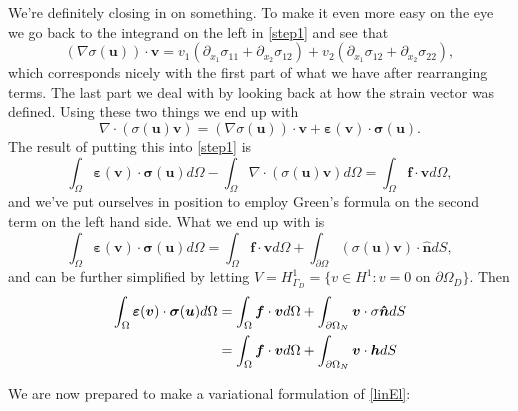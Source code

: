 \documentclass[paper=a4, fontsize=11pt]{scrartcl} %
\begin{document}
We're definitely closing in on something. To make it even more easy on the eye we go back to the integrand on the left in \ref{step1} and see that
\begin{equation*}
(\nabla \sigma(\boldsymbol{u}))\cdot \boldsymbol{v} = v_1(\partial_{x_1}\sigma_{11} + \partial_{x_2}\sigma_{12}) + v_2(\partial_{x_1}\sigma_{12} + \partial_{x_2}\sigma_{22}),
\end{equation*}
which corresponds nicely with the first part of what we have after rearranging terms. The last part we deal with by looking back at how the strain vector was defined. Using these two things we end up with
\begin{equation}
\label{step2}
\nabla \cdot (\sigma(\boldsymbol{u})\boldsymbol{v}) = (\nabla \sigma(\boldsymbol{u}))\cdot \boldsymbol{v} + \boldsymbol{\varepsilon}(\boldsymbol{v})\cdot \boldsymbol{\sigma}(\boldsymbol{u}).
\end{equation}
The result of putting this into \ref{step1} is
\begin{equation*}
\int_{\Omega}\boldsymbol{\varepsilon}(\boldsymbol{v})\cdot \boldsymbol{\sigma}(\boldsymbol{u})d\Omega - \int_{\Omega}\nabla \cdot (\sigma(\boldsymbol{u})\boldsymbol{v})d\Omega = \int_{\Omega}\boldsymbol{f}\cdot \boldsymbol{v} d\Omega,
\end{equation*}
and we've put ourselves in position to employ Green's formula on the second term on the left hand side. What we end up with is
\begin{equation*}
\int_{\Omega}\boldsymbol{\varepsilon}(\boldsymbol{v})\cdot \boldsymbol{\sigma}(\boldsymbol{u})d\Omega = \int_{\Omega}\boldsymbol{f}\cdot \boldsymbol{v} d\Omega + \int_{\partial \Omega}(\sigma(\boldsymbol{u})\boldsymbol{v})\cdot\boldsymbol{\hat{n}}dS,
\end{equation*}
and can be further simplified by letting $V = H^1_{\Gamma_D}=\{v \in H^1 : v=0$ on $\partial \Omega_D \}$. Then
\begin{align*}
\int_{\Omega}\boldsymbol{\varepsilon}(\boldsymbol{v})\cdot \boldsymbol{\sigma}(\boldsymbol{u})d\Omega &= \int_{\Omega}\boldsymbol{f}\cdot \boldsymbol{v} d\Omega + \int_{\partial \Omega_N}\boldsymbol{v}\cdot \sigma\boldsymbol{\hat{n}}dS  \notag \\
&= \int_{\Omega}\boldsymbol{f}\cdot \boldsymbol{v} d\Omega + \int_{\partial \Omega_N}\boldsymbol{v}\cdot\boldsymbol{h}dS
\end{align*}

We are now prepared to make a variational formulation of \ref{linEl}: 
\end{document}
